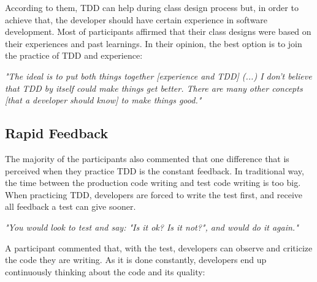 \documentclass[conference]{IEEEtran}
\begin{document}
According to them, TDD can help during class design process but, in order to achieve that,
the developer should have certain experience in software development. Most of participants
affirmed that their class designs were based on their experiences and past learnings.
In their opinion, the best option is to join the practice of TDD and experience:

\begin{framed}

	\textit{"The ideal is to put both things together [experience and TDD] (...) 
	I don't believe that TDD by itself could make things get better. There are many other
	concepts [that a developer should know] to make things good."}

\end{framed}

\subsection{Rapid Feedback}

The majority of the participants also commented that one difference that is
perceived when they practice TDD is the constant feedback. In traditional way,
the time between the production code writing and test code writing is too big.
When practicing TDD, developers are forced to write the test first, and receive all
feedback a test can give sooner.

\begin{framed}
	\textit{"You would look to test and say: "Is it ok? Is it not?", and would do it again."}
\end{framed}

A participant commented that, with the test, developers can observe
and criticize the code they are writing. As it is done constantly,
developers end up continuously thinking about the code and its
quality:
\end{document}
